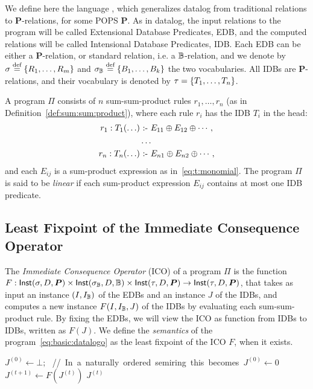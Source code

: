 We define here the language \datalogo, which generalizes datalog from
traditional relations to $\bm P$-relations, for some POPS $\bm P$.  As
in datalog, the input relations to the program will be called
Extensional Database Predicates, EDB, and the computed relations will
be called Intensional Database Predicates, IDB.  Each EDB can be
either a $\bm P$-relation, or standard relation, i.e. a $\mathbb B$-relation,
and we denote by $\sigma \stackrel{\text{def}}{=} \{R_1, \ldots, R_m\}$ and
$\sigma_\mathbb B \stackrel{\text{def}}{=} \{B_1, \ldots, B_k\}$ the two vocabularies.  All
IDBs are $\bm P$-relations, and their vocabulary is denoted by
$\tau = \{T_1, \ldots, T_n\}$.

A \datalogo program $\Pi$ consists of $n$ sum-sum-product rules
$r_1, \ldots, r_n$ (as in Definition~\ref{def:sum:sum:product}), where
each rule $r_i$ has the IDB $T_i$ in the head:
%
\begin{align}
  r_1: T_1(\ldots) & \text{ :- } E_{11}\oplus E_{12} \oplus \cdots, \nonumber \\
       & \ldots \label{eq:basic:datalogo} \\
  r_n: T_n(\ldots) & \text{ :- } E_{n1} \oplus E_{n2} \oplus \cdots, \nonumber
\end{align}
%
and each $E_{ij}$ is a sum-product expression as
in~\eqref{eq:t:monomial}.  The program $\Pi$ is said to be {\em
  linear} if each sum-product expression $E_{ij}$ contains at most one
IDB predicate.

\subsection{Least Fixpoint of the Immediate Consequence Operator}

\label{subsec:ico}

The {\em Immediate Consequence Operator} (ICO) of a program
$\Pi$ is the function
$F : \textsf{Inst}(\sigma,D,\bm P) \times \textsf{Inst}(\sigma_\mathbb B,D,\mathbb B) \times
\textsf{Inst}(\tau,D,\bm P) \rightarrow \textsf{Inst}(\tau,D,\bm P)$, that takes as
input an instance $(I, I_\mathbb B)$ of the EDBs and an instance $J$ of the
IDBs, and computes a new instance $F(I,I_\mathbb B,J)$ of the IDBs by
evaluating each sum-sum-product rule.  By fixing the EDBs, we will
view the ICO as function from IDBs to IDBs, written as $F(J)$. We
define the {\em semantics} of the \datalogo
program~\eqref{eq:basic:datalogo} as the least fixpoint of the ICO
$F$, when it exists.

\begin{algorithm}[th]
     $J^{(0)} \leftarrow \bot\mbox{;}$ \mbox{\hspace{2cm} // In a naturally ordered  semiring this becomes $J^{(0)} \leftarrow 0$}\\
    {
         {$J^{(t+1)} \leftarrow F(J^{(t)})$}\;
    }
    \Return $J^{(t)}$
    \caption{Na\"ive evaluation for \datalogo
    }
    \label{algo:naive}
\end{algorithm}

